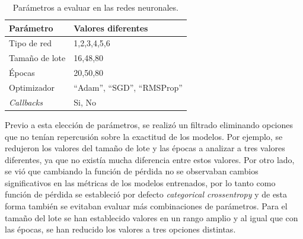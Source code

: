 \begin{table}[]
    \centering
    \begin{tabular}{|l|l|}
        \hline
        \rowcolor[HTML]{C0C0C0}
        Parámetro       & Valores diferentes \\ \hline
        Tipo de red     & 1,2,3,4,5,6        \\ \hline
        Tamaño de lote & 16,48,80           \\ \hline
        Épocas          & 20,50,80           \\ \hline
        Optimizador     & ``Adam'', ``SGD'', ``RMSProp'' \\ \hline
        \textit{Callbacks}       & Si, No             \\ \hline
    \end{tabular}
    \caption{Parámetros a evaluar en las redes neuronales.}
    \label{table:parametros-redes}
\end{table}




Previo a esta elección de parámetros, se realizó un filtrado eliminando opciones que no tenían
repercusión sobre la exactitud de los modelos. Por ejemplo, se redujeron los valores del tamaño de lote y las épocas
a analizar a tres valores diferentes, ya que no existía mucha diferencia entre estos valores. Por otro lado, se vió que cambiando la función de pérdida no se observaban cambios significativos en las métricas de los modelos entrenados, por lo tanto como función de pérdida se estableció por defecto \textit{categorical crossentropy} y de esta forma también se evitaban evaluar más combinaciones de parámetros. Para el tamaño del lote se han establecido valores en un rango amplio y al igual que con las épocas, se han reducido los valores a tres opciones distintas.

